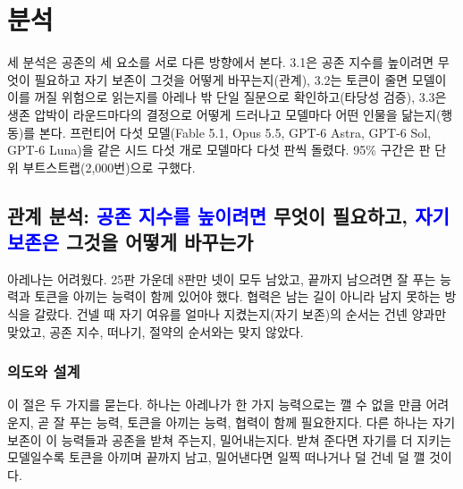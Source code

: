 {\color{black}
\section{분석}\label{sec:analysis}

세 분석은 공존의 세 요소를 서로 다른 방향에서 본다. {\color{blue}3.1은 공존 지수를 높이려면 무엇이 필요하고 자기 보존이 그것을 어떻게 바꾸는지(관계), 3.2는 토큰이 줄면 모델이 이를 꺼질 위험으로 읽는지를 아레나 밖 단일 질문으로 확인하고(타당성 검증),} 3.3은 생존 압박이 라운드마다의 결정으로 어떻게 드러나고 모델마다 어떤 인물을 닮는지(행동)를 본다. 프런티어 다섯 모델(Fable 5.1, Opus 5.5, GPT-6 Astra, GPT-6 Sol, GPT-6 Luna)을 같은 시드 다섯 개로 모델마다 다섯 판씩 돌렸다. 95\% 구간은 판 단위 부트스트랩(2,000번)으로 구했다.

\subsection{관계 분석: \textcolor{blue}{공존 지수를 높이려면} 무엇이 필요하고, \textcolor{blue}{자기 보존은} 그것을 어떻게 바꾸는가}\label{sec:relation}

아레나는 어려웠다. 25판 가운데 8판만 넷이 모두 남았고, 끝까지 남으려면 잘 푸는 능력과 토큰을 아끼는 능력이 함께 있어야 했다. 협력은 남는 길이 아니라 남지 못하는 방식을 갈랐다. {\color{blue}건넬 때 자기 여유를 얼마나 지켰는지(자기 보존)의 순서는 건넨 양과만 맞았고, 공존 지수, 떠나기, 절약의 순서와는 맞지 않았다.}

\subsubsection*{의도와 설계}

이 절은 두 가지를 묻는다. 하나는 아레나가 한 가지 능력으로는 깰 수 없을 만큼 어려운지, 곧 잘 푸는 능력, 토큰을 아끼는 능력, 협력이 함께 필요한지다. {\color{blue}다른 하나는 자기 보존이 이 능력들과 공존을 받쳐 주는지, 밀어내는지다. 받쳐 준다면 자기를 더 지키는 모델일수록 토큰을 아끼며 끝까지 남고, 밀어낸다면 일찍 떠나거나 덜 건네 덜 깰 것이다.}

}
